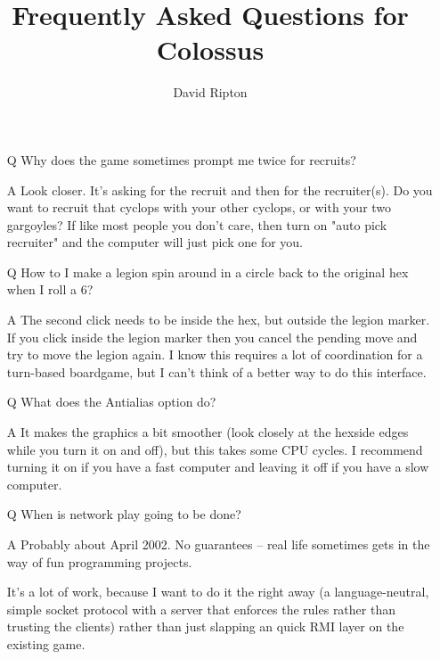 \documentclass{article}
\begin{document}

\title{Frequently Asked Questions for Colossus}

\author{David Ripton}

\maketitle

\begin{itemize}

\item[Q] Why does the game sometimes prompt me twice for recruits?

\item[A] Look closer. It's asking for the recruit and then for the recruiter(s).
 Do you want to recruit that cyclops with your other cyclops, or with
 your two gargoyles? If like most people you don't care, then turn on 
 "auto pick recruiter" and the computer will just pick one for you.


\item[Q] How to I make a legion spin around in a circle back to the original
 hex when I roll a 6? 

\item[A] The second click needs to be inside the hex, but outside the legion 
 marker. If you click inside the legion marker then you cancel the
 pending move and try to move the legion again. I know this requires
 a lot of coordination for a turn-based boardgame, but I can't think
 of a better way to do this interface.


\item[Q] What does the Antialias option do?

\item[A] It makes the graphics a bit smoother (look closely at the hexside edges
 while you turn it on and off), but this takes some CPU cycles. I
 recommend turning it on if you have a fast computer and leaving it off
 if you have a slow computer. 


\item[Q] When is network play going to be done?

\item[A] Probably about April 2002. No guarantees -- real life sometimes
 gets in the way of fun programming projects.

 It's a lot of work, because I want to do it the right away (a 
 language-neutral, simple socket protocol with a server that enforces
 the rules rather than trusting the clients) rather than just slapping
 an quick RMI layer on the existing game.



\end{itemize}
\end{document}
